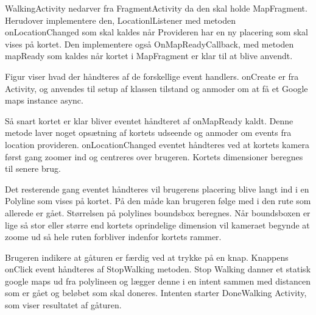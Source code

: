 WalkingActivity nedarver fra FragmentActivity da den skal holde MapFragment. Herudover implementere den, LocationlListener med metoden onLocationChanged som skal kaldes når Provideren har en ny placering som skal vises på kortet. Den implementere også OnMapReadyCallback, med metoden mapReady som kaldes når kortet i MapFragment er klar til at blive anvendt.

Figur  viser hvad der håndteres af de forskellige event handlers. onCreate er fra Activity, og anvendes til setup af klassen tilstand og anmoder om at få et Google maps instance async.

Så snart kortet er klar bliver eventet håndteret af onMapReady kaldt. Denne metode laver noget opsætning af kortets udseende og anmoder om events fra location provideren. onLocationChanged eventet håndteres ved at kortets kamera først gang zoomer ind og centreres over brugeren. Kortets dimensioner beregnes til senere brug.

Det resterende gang eventet håndteres vil brugerens placering blive langt ind i en Polyline som vises på kortet. På den måde kan brugeren følge med i den rute som allerede er gået. Størrelsen på polylines boundsbox beregnes. Når boundsboxen er lige så stor eller større end kortets oprindelige dimension vil kameraet begynde at zoome ud så hele ruten forbliver indenfor kortets rammer.

Brugeren indikere at gåturen er færdig ved at trykke på en knap. Knappens onClick event håndteres af StopWalking metoden. Stop Walking danner et statisk google maps ud fra polylineen og lægger denne i en intent sammen med distancen som er gået og beløbet som skal doneres. Intenten starter DoneWalking Activity, som viser resultatet af gåturen.




\FloatBarrier
